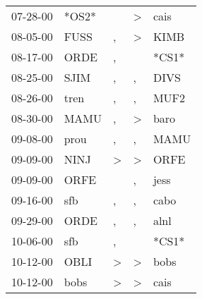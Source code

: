 \begin{supertabular}{p{0.07\textwidth}p{0.06\textwidth}p{0.02\textwidth}p{0.02\textwidth}p{0.06\textwidth}}
          07-28-00\textsuperscript{} &                            *OS2* &                  &     \textgreater &           cais\textsuperscript{} \\
          08-05-00\textsuperscript{} &           FUSS\textsuperscript{} &                , &     \textgreater &           KIMB\textsuperscript{} \\
          08-17-00\textsuperscript{} &           ORDE\textsuperscript{} &                , &                  &                            *CS1* \\
          08-25-00\textsuperscript{} &           SJIM\textsuperscript{} &                , &                , &           DIVS\textsuperscript{} \\
          08-26-00\textsuperscript{} &           tren\textsuperscript{} &                , &                , &           MUF2\textsuperscript{} \\
          08-30-00\textsuperscript{} &           MAMU\textsuperscript{} &                , &     \textgreater &           baro\textsuperscript{} \\
          09-08-00\textsuperscript{} &           prou\textsuperscript{} &                , &                , &           MAMU\textsuperscript{} \\
          09-09-00\textsuperscript{} &           NINJ\textsuperscript{} &     \textgreater &     \textgreater &           ORFE\textsuperscript{} \\
          09-09-00\textsuperscript{} &           ORFE\textsuperscript{} &                  &                , &           jess\textsuperscript{} \\
          09-16-00\textsuperscript{} &            sfb\textsuperscript{} &                , &                , &           cabo\textsuperscript{} \\
          09-29-00\textsuperscript{} &           ORDE\textsuperscript{} &                , &                , &           alnl\textsuperscript{} \\
          10-06-00\textsuperscript{} &            sfb\textsuperscript{} &                , &                  &                            *CS1* \\
          10-12-00\textsuperscript{} &           OBLI\textsuperscript{} &     \textgreater &     \textgreater &           bobs\textsuperscript{} \\
          10-12-00\textsuperscript{} &           bobs\textsuperscript{} &     \textgreater &     \textgreater &           cais\textsuperscript{} \\

\end{supertabular}

